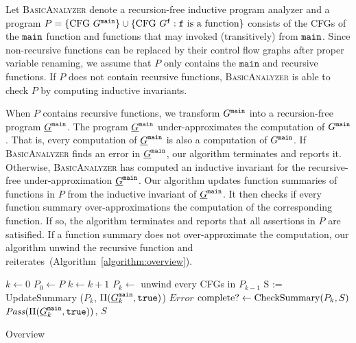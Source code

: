 
Let \textsc{BasicAnalyzer} denote a recursion-free inductive program
analyzer and a program $P=\{\mbox{CFG }G^{\mathtt{{main}}}\}\cup\{\mbox{CFG } G^{\mathtt{{f}}} : \mathtt{{f}}\mbox{ is a function}\}$ consists of the CFGs of the $\mathtt{{main}}$ function and functions that may invoked (transitively) from $\mathtt{{main}}$.
Since non-recursive functions can be replaced by their control flow graphs
after proper variable renaming, we assume that $P$ only contains the
$\mathtt{main}$ and recursive functions. If $P$ does not contain
recursive functions, \textsc{BasicAnalyzer} is able to check $P$ by
computing inductive invariants.

When $P$ contains recursive functions, we transform $G^{\mathtt{{main}}}$ into a
recursion-free program $\underline{G}^{\mathtt{{main}}}$. The program $\underline{G}^{\mathtt{{main}}}$
under-approximates the computation of $G^{\mathtt{{main}}}$. That is, every computation
of $\underline{G}^{\mathtt{{main}}}$ is also a computation of $G^{\mathtt{{main}}}$. If
\textsc{BasicAnalyzer} finds an error in $\underline{G}^{\mathtt{{main}}}$, our
algorithm terminates and reports it. Otherwise,
\textsc{BasicAnalyzer} has computed an inductive invariant for the
recursive-free under-approximation $\underline{G}^{\mathtt{{main}}}$. Our algorithm
updates function summaries of functions in $P$ from the inductive invariant of
$\underline{G}^{\mathtt{{main}}}$. It then checks if every function summary
over-approximations the computation of the corresponding function. If
so, the algorithm terminates and reports that all assertions in $P$
are satisified. If a function summary does not over-approximate the
computation, our algorithm unwind the recursive function and
reiterates~(Algorithm~\ref{algorithm:overview}).

\begin{algorithm}

  $k \leftarrow 0$\;
  $P_0 \leftarrow P$\;
  {
    $k \leftarrow k + 1$\;
    $P_{k} \leftarrow $ unwind every CFGs in $P_{k-1}$\;
    {
      {    
        S := UpdateSummary ($P_k$, $\Pi (\underline{G}^{\mathtt{{main}}}_k, \mathtt{true})$)\;
      }
      {
        \Return $\mathit{Error}$\;
      }
    }
    $\textmd{complete?} \leftarrow \textmd{CheckSummary} (P_k, S)$\;
  }
  \Return $\mathit{Pass} (\Pi (\underline{G}^{\mathtt{{main}}}_k, \mathtt{true}))$, $S$\;
  \caption{Overview}
  \label{algorithm:overview}
\end{algorithm}

